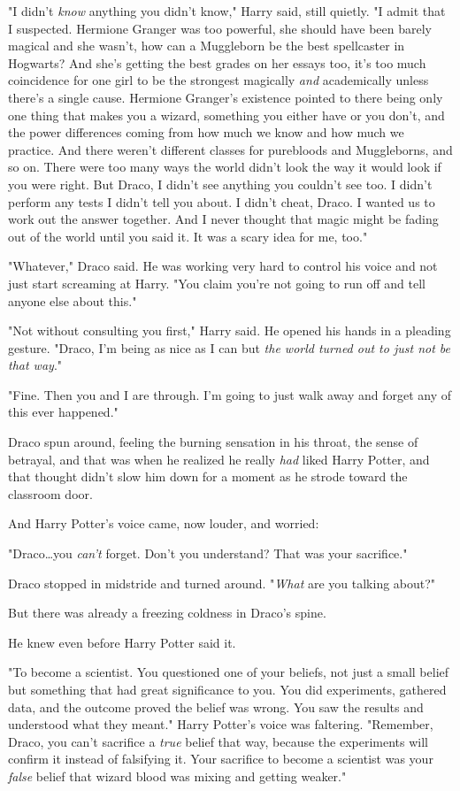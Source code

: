 "I didn't \emph{know} anything you didn't know," Harry said, still quietly. "I
admit that I suspected. Hermione Granger was too powerful, she should have been
barely magical and she wasn't, how can a Muggleborn be the best spellcaster in
Hogwarts? And she's getting the best grades on her essays too, it's too much
coincidence for one girl to be the strongest magically \emph{and} academically
unless there's a single cause. Hermione Granger's existence pointed to there
being only one thing that makes you a wizard, something you either have or you
don't, and the power differences coming from how much we know and how much we
practice. And there weren't different classes for purebloods and Muggleborns,
and so on. There were too many ways the world didn't look the way it would look
if you were right. But Draco, I didn't see anything you couldn't see too. I
didn't perform any tests I didn't tell you about. I didn't cheat, Draco. I
wanted us to work out the answer together. And I never thought that magic might
be fading out of the world until you said it. It was a scary idea for me, too."

"Whatever," Draco said. He was working very hard to control his voice and not
just start screaming at Harry. "You claim you're not going to run off and tell
anyone else about this."

"Not without consulting you first," Harry said. He opened his hands in a
pleading gesture. "Draco, I'm being as nice as I can but \emph{the world turned
out to just not be that way}."

"Fine. Then you and I are through. I'm going to just walk away and forget any
of this ever happened."

Draco spun around, feeling the burning sensation in his throat, the sense of
betrayal, and that was when he realized he really \emph{had} liked Harry
Potter, and that thought didn't slow him down for a moment as he strode toward
the classroom door.

And Harry Potter's voice came, now louder, and worried:

"Draco…you \emph{can't} forget. Don't you understand? That was your
sacrifice."

Draco stopped in midstride and turned around. "\emph{What} are you talking
about?"

But there was already a freezing coldness in Draco's spine.

He knew even before Harry Potter said it.

"To become a scientist. You questioned one of your beliefs, not just a small
belief but something that had great significance to you. You did experiments,
gathered data, and the outcome proved the belief was wrong. You saw the results
and understood what they meant." Harry Potter's voice was faltering. "Remember,
Draco, you can't sacrifice a \emph{true} belief that way, because the
experiments will confirm it instead of falsifying it. Your sacrifice to become
a scientist was your \emph{false} belief that wizard blood was mixing and
getting weaker."


